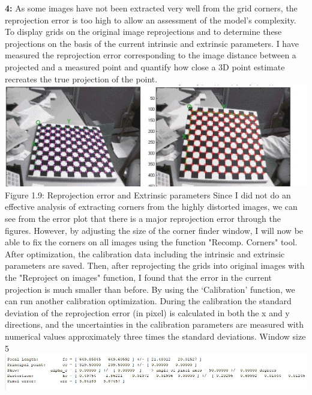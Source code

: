 \documentclass[a4paper, 12pt]{report}
\begin{document}
\textbf{4:} As some images have not been extracted very well from the grid corners, the reprojection error is too high to allow an assessment of the model's complexity. \newline 
To display grids on the original image reprojections and to determine these projections on the basis of the current intrinsic and extrinsic parameters. I have measured the reprojection error corresponding to the image distance between a projected and a measured point and quantify how close a 3D point estimate recreates the true projection of the point.
\newline
\includegraphics[width=1\textwidth]{resources/image/10.jpg} \newline
Figure 1.9: Reprojection error and Extrinsic parameters \newline \newline
Since I did not do an effective analysis of extracting corners from the highly distorted images, we can see from the error plot that there is a major reprojection error through the figures. However, by adjusting the size of the corner finder window, I will now be able to fix the corners on all images using the function "Recomp. Corners" tool. After optimization, the calibration data including the intrinsic and extrinsic parameters are saved. \newline 
Then, after reprojecting the grids into original images with the "Reproject on images" function, I found that the error in the current projection is much smaller than before. \newline 
By using the ‘Calibration' function, we can run another calibration optimization. During the calibration the standard deviation of the reprojection error (in pixel) is calculated in both the x and y directions, and the uncertainties in the calibration parameters are measured with numerical values approximately three times the standard deviations. \newpage
Window size 5 \newline 
\includegraphics[width=1.0\textwidth]{resources/image/im8n.jpg} \newline
\end{document}
